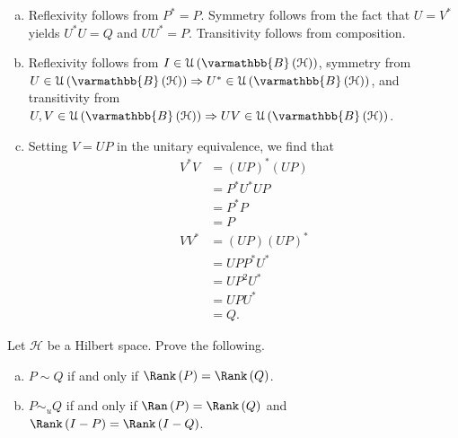 \documentclass[10pt]{mypackage}
\renewcommand*{\mathbb}[1]{\varmathbb{#1}}
\newcommand{\B}{\mathbb{B}}
\begin{document}
\begin{solution}
  \begin{enumerate}[(a)]
    \item Reflexivity follows from $P^{\ast} = P$. Symmetry follows from the fact that $U = V^{\ast}$ yields $U^{\ast}U = Q$ and $UU^{\ast} = P$. Transitivity follows from composition.
    \item Reflexivity follows from $I\in \mathcal{U}\left(\B\left(\mathcal{H}\right)\right)$, symmetry from $U \in \mathcal{U}\left(\B\left(\mathcal{H}\right)\right)\Rightarrow U^{\ast}\in \mathcal{U}\left(\B\left(\mathcal{H}\right)\right)$, and transitivity from $U,V\in \mathcal{U}\left(\B\left(\mathcal{H}\right)\right) \Rightarrow UV\in \mathcal{U}\left(\B\left(\mathcal{H}\right)\right)$.
    \item Setting $V = UP$ in the unitary equivalence, we find that
      \begin{align*}
        V^{\ast}V &= \left(UP\right)^{\ast}\left(UP\right)\\
                  &= P^{\ast}U^{\ast}UP\\
                  &= P^{\ast}P\\
                  &= P\\
        VV^{\ast} &= \left(UP\right)\left(UP\right)^{\ast}\\
                  &= UPP^{\ast}U^{\ast}\\
                  &= UP^2U^{\ast}\\
                  &= UPU^{\ast}\\
                  &= Q.
      \end{align*}
  \end{enumerate}
\end{solution}
\begin{exercise}
  Let $\mathcal{H}$ be a Hilbert space. Prove the following.
  \begin{enumerate}[(a)]
    \item $P\sim Q$ if and only if $\Rank\left(P\right) = \Rank\left(Q\right)$.
    \item $P\sim_{u} Q$ if and only if $\Ran\left(P\right) = \Rank\left(Q\right)$ and $\Rank\left(I-P\right) = \Rank\left(I-Q\right)$.
  \end{enumerate}
\end{exercise}
\end{document}
